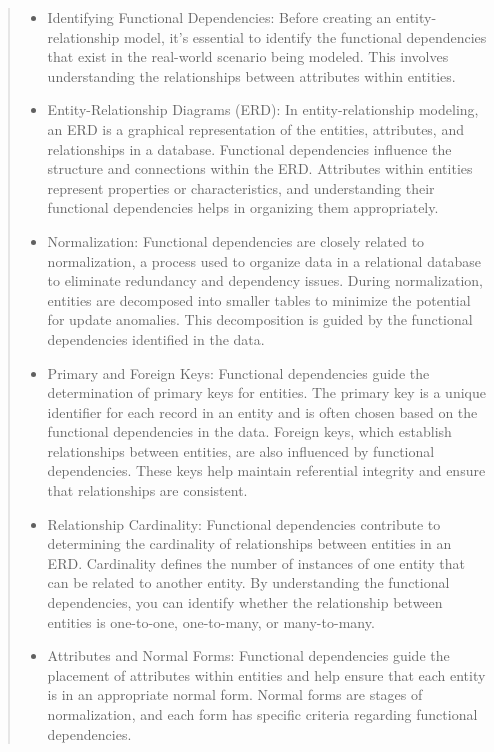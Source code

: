 \documentclass[11pt]{article}
\begin{document}
\begin{enumerate}
\begin{quotation}
\begin{itemize}
\item    Identifying Functional Dependencies:
        Before creating an entity-relationship model, it's essential to identify the functional dependencies that exist in the real-world scenario being modeled. This involves understanding the relationships between attributes within entities.

\item    Entity-Relationship Diagrams (ERD):
        In entity-relationship modeling, an ERD is a graphical representation of the entities, attributes, and relationships in a database. Functional dependencies influence the structure and connections within the ERD.
        Attributes within entities represent properties or characteristics, and understanding their functional dependencies helps in organizing them appropriately.

\item    Normalization:
        Functional dependencies are closely related to normalization, a process used to organize data in a relational database to eliminate redundancy and dependency issues.
        During normalization, entities are decomposed into smaller tables to minimize the potential for update anomalies. This decomposition is guided by the functional dependencies identified in the data.

  \item  Primary and Foreign Keys:
        Functional dependencies guide the determination of primary keys for entities. The primary key is a unique identifier for each record in an entity and is often chosen based on the functional dependencies in the data.
        Foreign keys, which establish relationships between entities, are also influenced by functional dependencies. These keys help maintain referential integrity and ensure that relationships are consistent.

\item    Relationship Cardinality:
        Functional dependencies contribute to determining the cardinality of relationships between entities in an ERD. Cardinality defines the number of instances of one entity that can be related to another entity.
        By understanding the functional dependencies, you can identify whether the relationship between entities is one-to-one, one-to-many, or many-to-many.

\item    Attributes and Normal Forms:
        Functional dependencies guide the placement of attributes within entities and help ensure that each entity is in an appropriate normal form. Normal forms are stages of normalization, and each form has specific criteria regarding functional dependencies.


\end{itemize}
\end{quotation}
\end{enumerate}
\end{document}
